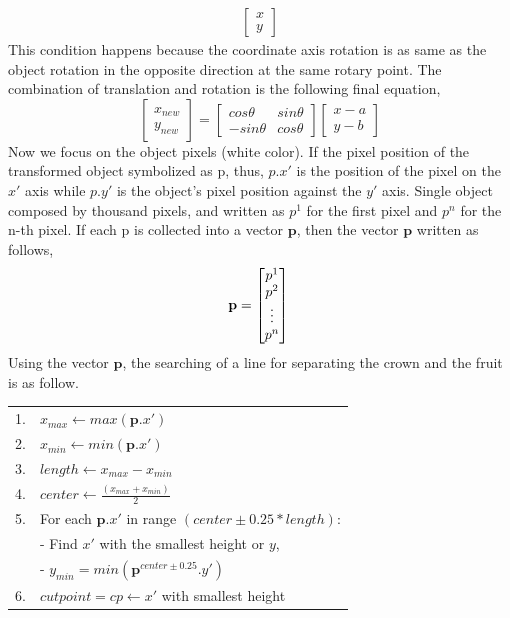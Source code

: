 \documentclass[11pt]{article}
\begin{document}
\begin{linenumbers}
\begin{equation}
\begin{split}
\begin{bmatrix}
		x\\y
	\end{bmatrix} 
\end{split}
\end{equation}
This condition happens because the coordinate axis rotation is as same as the object rotation in the opposite direction at the same rotary point. The combination of translation and rotation is the following final equation,
\begin{equation}
	\begin{bmatrix}
		x_{new} \\
		y_{new}
	\end{bmatrix} = \begin{bmatrix}
	cos \theta  & sin \theta \\
	-sin \theta & cos \theta
\end{bmatrix} 
\begin{bmatrix}
	x-a\\
	y-b
\end{bmatrix}
\end{equation}
Now we focus on the object pixels (white color). If the pixel position of the transformed object symbolized as p, thus, \(p.{x'}\) is the position of the pixel on the \(x'\) axis while \(p.{y'}\) is the object's pixel position against the \(y'\) axis. Single object composed by thousand pixels, and written as \(p^1\) for the first pixel and \(p^n\) for the  n-th pixel. If each p is collected into a vector \(\textbf{p}\), then the vector \(\textbf{p}\) written as follows,
\begin{equation}
	\textbf{p} = \begin{bmatrix}
		p^1 \\
		p^2 \\
		\vdots \\
		p^n
	\end{bmatrix} \\
\end{equation}
Using the vector \(\textbf{p}\), the searching of a line for separating the crown and the fruit is as follow.

\begin{tabular}{ p{0.2cm} p{10cm}}
	\hline
	1. & \(x_{max} \leftarrow max(\textbf{p}.x')\)	\\
	2. & \(x_{min} \leftarrow min(\textbf{p}.x')\)	\\
	3. & \(length \leftarrow x_{max} - x_{min}\)	\\
	4. & \(center \leftarrow \frac{(x_{max} + x_{min})}{2}\)	\\
	5. & For each \(\textbf{p}.x'\) in range \((center \pm 0.25*length)\):\\
	& - Find \(x'\) with the smallest height or \(y\), 	\\
	& - \(y_{min} = min(\textbf{p}^{center \pm 0.25}.y')\) 	\\
	6. & \(cut point = cp \leftarrow x'\) with smallest height 		\\
	\hline	
\end{tabular}


\end{linenumbers}
\end{document}
